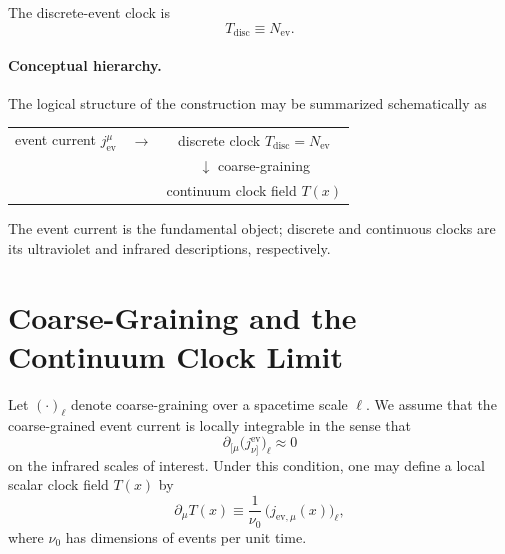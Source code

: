 \documentclass[pdflatex,sn-mathphys-num]{sn-jnl}
\theoremstyle{thmstylethree}
\theoremstyle{thmstyleone}
\theoremstyle{thmstyletwo}
\numberwithin{equation}{section}
\newcommand{\Nev}{N_{\mathrm{ev}}}
\begin{document}
    The discrete-event clock is
    \begin{equation}
        T_{\mathrm{disc}} \equiv \Nev .
    \end{equation}
    
    \paragraph{Conceptual hierarchy.}
        The logical structure of the construction may be summarized schematically as
        \begin{center}
            \begin{tabular}{c c c}
                event current $j^\mu_{\mathrm{ev}}$
                & $\longrightarrow$ &
                discrete clock $T_{\mathrm{disc}} = N_{\mathrm{ev}}$ \\
                & &
                $\downarrow$ coarse-graining \\
                & &
                continuum clock field $T(x)$
            \end{tabular}
        \end{center}
        The event current is the fundamental object; discrete and continuous clocks are its ultraviolet and infrared descriptions, respectively.

    \section{Coarse-Graining and the Continuum Clock Limit}
    
    Let $(\cdot)_\ell$ denote coarse-graining over a spacetime scale $\ell$. We assume that the coarse-grained event current is locally integrable in the sense that
    \begin{equation}
        \partial_{[\mu}\big(j^{\mathrm{ev}}_{\nu]}\big)_\ell \approx 0
        \label{eq:integrability}
    \end{equation}
    on the infrared scales of interest. Under this condition, one may define a local scalar clock field $T(x)$ by
    \begin{equation}
        \partial_\mu T(x) \equiv \frac{1}{\nu_0}\,\big(j_{\mathrm{ev},\mu}(x)\big)_\ell ,
        \label{eq:clockgradient}
    \end{equation}
    where $\nu_0$ has dimensions of events per unit time.
    
\end{document}
